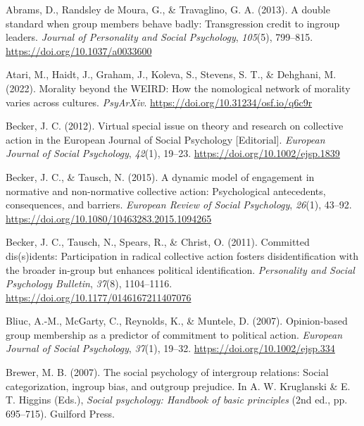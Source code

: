 \documentclass[12pt, letterpaper]{article}
\newenvironment{CSLReferences}[2]{}{}
\begin{document}
\hypertarget{refs}{}
\begin{CSLReferences}{1}{0}
\leavevmode{}%
Abrams, D., Randsley de Moura, G., \& Travaglino, G. A. (2013). A double
standard when group members behave badly: {Transgression} credit to
ingroup leaders. \emph{Journal of Personality and Social Psychology},
\emph{105}(5), 799--815. \url{https://doi.org/10.1037/a0033600}

\leavevmode{}%
Atari, M., Haidt, J., Graham, J., Koleva, S., Stevens, S. T., \&
Dehghani, M. (2022). Morality beyond the {WEIRD}: How the nomological
network of morality varies across cultures. \emph{PsyArXiv}.
\url{https://doi.org/10.31234/osf.io/q6c9r}

\leavevmode{}%
Becker, J. C. (2012). Virtual special issue on theory and research on
collective action in the {European} {Journal} of {Social} {Psychology}
{[}{Editorial}{]}. \emph{European Journal of Social Psychology},
\emph{42}(1), 19--23. \url{https://doi.org/10.1002/ejsp.1839}

\leavevmode{}%
Becker, J. C., \& Tausch, N. (2015). A dynamic model of engagement in
normative and non-normative collective action: {Psychological}
antecedents, consequences, and barriers. \emph{European Review of Social
Psychology}, \emph{26}(1), 43--92.
\url{https://doi.org/10.1080/10463283.2015.1094265}

\leavevmode{}%
Becker, J. C., Tausch, N., Spears, R., \& Christ, O. (2011). Committed
dis(s)idents: {Participation} in radical collective action fosters
disidentification with the broader in-group but enhances political
identification. \emph{Personality and Social Psychology Bulletin},
\emph{37}(8), 1104--1116. \url{https://doi.org/10.1177/0146167211407076}

\leavevmode{}%
Bliuc, A.-M., McGarty, C., Reynolds, K., \& Muntele, D. (2007).
Opinion-based group membership as a predictor of commitment to political
action. \emph{European Journal of Social Psychology}, \emph{37}(1),
19--32. \url{https://doi.org/10.1002/ejsp.334}

\leavevmode{}%
Brewer, M. B. (2007). The social psychology of intergroup relations:
Social categorization, ingroup bias, and outgroup prejudice. In A. W.
Kruglanski \& E. T. Higgins (Eds.), \emph{Social psychology: Handbook of
basic principles} (2nd ed., pp. 695--715). Guilford Press.


\end{CSLReferences}
\end{document}
